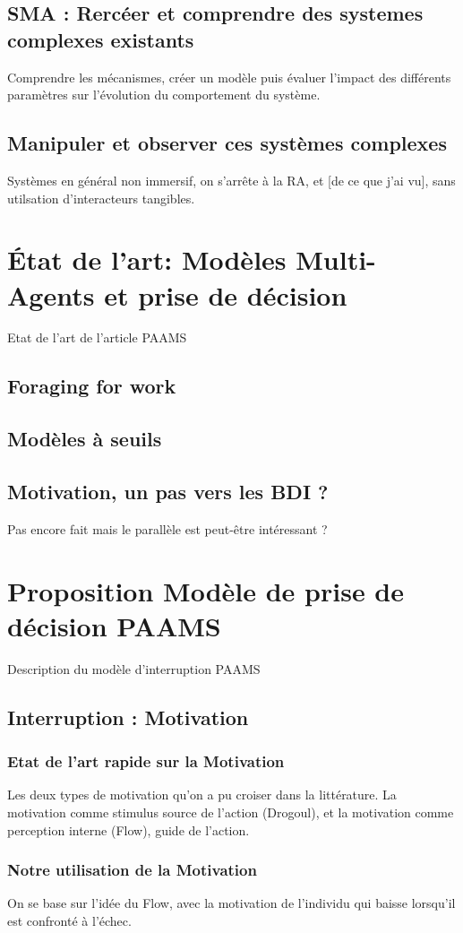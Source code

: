 \documentclass[10pt,a4paper]{article}
\begin{document}
	\subsection{SMA : Rercéer et comprendre des systemes complexes existants}
		Comprendre les mécanismes, créer un modèle puis évaluer l'impact des différents paramètres sur l'évolution du comportement du système.
	\subsection{Manipuler et observer ces systèmes complexes}
		Systèmes en général non immersif, on s'arrête à la RA, et [de ce que j'ai vu], sans utilsation d'interacteurs tangibles.
\section{État de l'art: Modèles Multi-Agents et prise de décision}
	Etat de l'art de l'article PAAMS
	\subsection{Foraging for work}
	\subsection{Modèles à seuils}
	\subsection{Motivation, un pas vers les BDI ?}
		Pas encore fait mais le parallèle est peut-être intéressant ?
\section{Proposition Modèle de prise de décision PAAMS}
	Description du modèle d'interruption PAAMS	
	\subsection{Interruption : Motivation}
		\subsubsection{Etat de l'art rapide sur la Motivation}
			Les deux types de motivation qu'on a pu croiser dans la littérature. La motivation comme stimulus source de l'action (Drogoul), et la motivation comme perception interne (Flow), guide de l'action.
		\subsubsection{Notre utilisation de la Motivation}
			On se base sur l'idée du Flow, avec la motivation de l'individu qui baisse lorsqu'il est confronté à l'échec.
\end{document}
